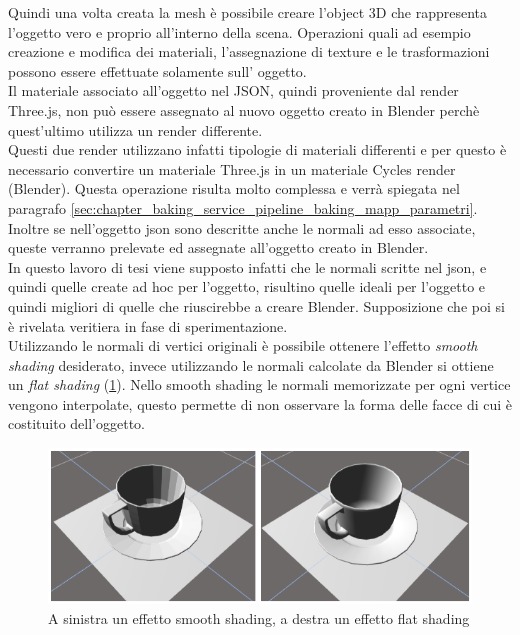 Quindi una volta creata la mesh è possibile creare l’object 3D che rappresenta l’oggetto vero e proprio all’interno della scena. Operazioni quali ad esempio creazione e modifica dei materiali, l’assegnazione di texture e le trasformazioni possono essere effettuate solamente sull’ oggetto.
\\
Il materiale associato all’oggetto nel JSON, quindi proveniente dal render Three.js, non può essere assegnato al nuovo oggetto creato in Blender perchè quest’ultimo utilizza un render differente. 
\\
Questi due render utilizzano infatti tipologie di materiali differenti e per questo è necessario convertire un materiale Three.js in un materiale Cycles render (Blender). Questa operazione risulta molto complessa e verrà spiegata nel paragrafo \ref{sec:chapter_baking_service_pipeline_baking_mapp_parametri}.
\\
Inoltre se nell’oggetto json sono descritte anche le normali ad esso associate, queste verranno prelevate ed assegnate all’oggetto creato in Blender.
\\
In questo lavoro di tesi viene supposto infatti che le normali scritte nel json, e quindi quelle create ad hoc per l’oggetto, risultino quelle ideali per l’oggetto e quindi migliori di quelle che riuscirebbe a creare Blender.
Supposizione che poi si è rivelata veritiera in fase di sperimentazione.
\\
Utilizzando le normali di vertici originali è possibile ottenere l’effetto \emph{smooth shading} desiderato, invece utilizzando le normali calcolate da Blender si ottiene un \emph{flat shading} (\ref{fig:baking_service_flat_smooth}).
Nello smooth shading le normali memorizzate per ogni vertice vengono interpolate, questo permette di non osservare la forma delle facce di cui è costituito dell’oggetto.
\\
\begin{figure}[htb]
 \centering
 \includegraphics[width=1\linewidth]{images/chapter_baking_service/flat_smooth.png}\hfill
 \caption[Smooth shading e flat shading in Blender.]{A sinistra un effetto smooth shading, a destra un  effetto flat shading}
 \label{fig:baking_service_flat_smooth}
\end{figure}
